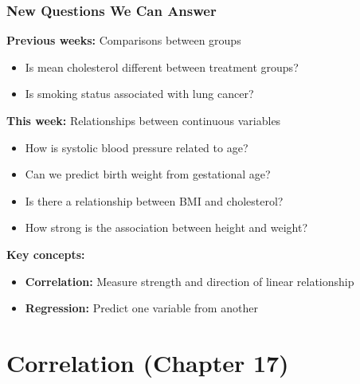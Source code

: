 \documentclass{beamer}
\begin{document}
\begin{frame}
\frametitle{New Questions We Can Answer}
\textbf{Previous weeks:} Comparisons between groups
\begin{itemize}
\item Is mean cholesterol different between treatment groups?
\item Is smoking status associated with lung cancer?
\end{itemize}

\vspace{0.5cm}
\textbf{This week:} Relationships between continuous variables
\begin{itemize}
\item How is systolic blood pressure related to age?
\item Can we predict birth weight from gestational age?
\item Is there a relationship between BMI and cholesterol?
\item How strong is the association between height and weight?
\end{itemize}

\vspace{0.5cm}
\textbf{Key concepts:}
\begin{itemize}
\item \textbf{Correlation:} Measure strength and direction of linear relationship
\item \textbf{Regression:} Predict one variable from another
\end{itemize}
\end{frame}

\section{Correlation (Chapter 17)}
\end{document}
